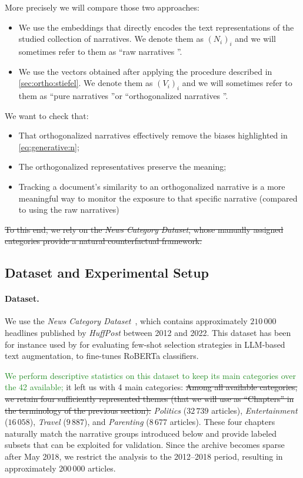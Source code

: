 \documentclass[
  journal=medium,
  manuscript=article-type,
  year=2025,
  volume=1,
]{cup-journal}
\def\og{``}
\def\fg{''}
\begin{document}
More precisely we will compare those two approaches: 
\begin{itemize}
    \item We use the embeddings that directly encodes the text representations of the studied collection of narratives. We denote them as $(N_i)_i$ and we will sometimes refer to them as \og raw narratives \fg. 
    \item We use the vectors obtained after applying the procedure described in \ref{sec:ortho:stiefel}. We denote them as $(V_i)_i$ and we will sometimes refer to them as \og pure narratives \fg or \og orthogonalized narratives \fg. 
\end{itemize}

We want to check that: 
\begin{itemize}
    \item That orthogonalized narratives effectively remove the biases highlighted in \ref{eq:generative:n};
    \item The orthogonalized representatives preserve the meaning;
    \item Tracking a document's similarity to an orthogonalized narrative is a more meaningful way to monitor the exposure to that specific narrative (compared to using the raw narratives)
\end{itemize}


\st{To this end, we rely on the \emph{News Category Dataset}, %
whose manually assigned categories provide a natural counterfactual framework.}

\subsection{Dataset and Experimental Setup}
\label{sec:application:data}

\paragraph{Dataset.}
We use the \emph{News Category Dataset}~\autocite{misra2022news}, which contains approximately $210\,000$ headlines published by \emph{HuffPost} between 2012 and 2022. 
This dataset has been for instance used by \autocite{fewshot2024augmentation} for evaluating few-shot selection strategies in LLM-based text augmentation, 
\autocite{mediabias2024generated} to fine-tunes RoBERTa classifiers.

\textcolor{ForestGreen}{We perform descriptive statistics on this dataset to keep its main categories over the 42 available;} it left us with 4 main categories: \st{Among all available categories, we retain four sufficiently represented themes (that we will use as ``Chapters'' in the terminology of the previous section):} \emph{Politics} ($32\,739$ articles), \emph{Entertainment} ($16\,058$),
\emph{Travel} ($9\,887$), and \emph{Parenting} ($8\,677$ articles). These four chapters naturally match the narrative groups introduced below and provide labeled subsets that can be exploited for validation.
Since the archive becomes sparse after May 2018, we restrict the analysis to the 2012--2018 period, resulting in approximately $200\,000$ articles.
\end{document}
